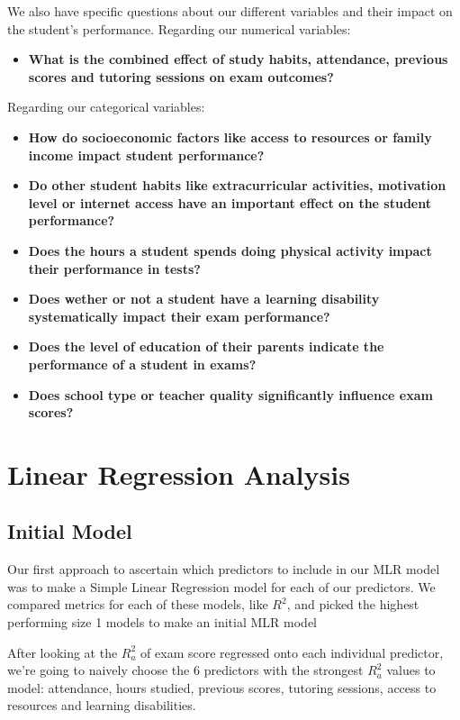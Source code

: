 \documentclass[twocolumn]{article} %
\begin{document}
We also have specific questions about our different variables and their impact on the student's performance.
\newline\newline
Regarding our numerical variables:
\begin{itemize}
\item
      \textbf{What is the combined effect of study habits, attendance, previous scores and tutoring sessions on exam outcomes?}
\end{itemize}
Regarding our categorical variables:
\begin{itemize}
\item
    \textbf{How do socioeconomic factors like access to resources or family income impact student performance?}
\item
    \textbf{Do other student habits like extracurricular activities, motivation level or internet access have an important effect on the student performance?}
\item
    \textbf{Does the hours a student spends doing physical activity impact their performance in tests?}
\item
    \textbf{Does wether or not a student have a learning disability systematically impact their exam performance?}
\item
    \textbf{Does the level of education of their parents indicate the performance of a student in exams?}
\item
    \textbf{Does school type or teacher quality significantly influence exam scores?}
\end{itemize}

\newpage
\section{Linear Regression Analysis}

\subsection*{Initial Model}

Our first approach to ascertain which predictors to include in our MLR model was to make a Simple Linear Regression model for each of our predictors. We compared metrics for each of these models, like $R^2$, and picked the highest performing size 1 models to make an initial MLR model %
	
After looking at the $R^2_a$ of exam score regressed onto each individual predictor, we're going to naively choose the 6 predictors with the strongest $R^2_a$ values to model: attendance, hours studied, previous scores, tutoring sessions, access to resources and learning disabilities.
\end{document}
